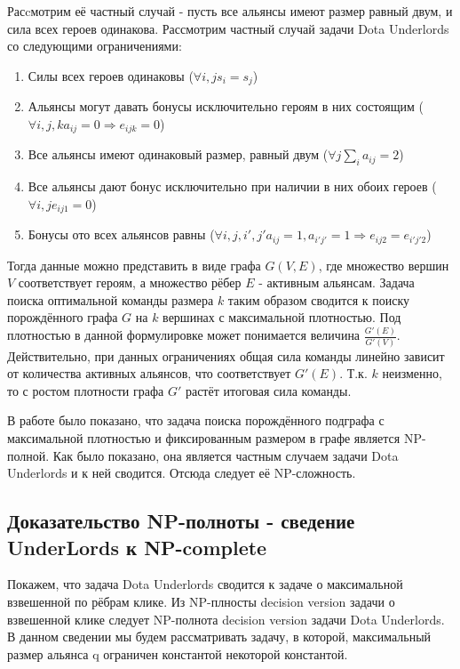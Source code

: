 \documentclass{article}
\begin{document}
Расcмотрим её частный случай - пусть все альянсы имеют размер равный двум, и сила всех героев одинакова. Рассмотрим частный случай задачи Dota Underlords со следующими ограничениями:

\begin{enumerate}
    \item Силы всех героев одинаковы ($\forall i, j s_i=s_j$)
    \item Альянсы могут давать бонусы исключительно героям в них состоящим ($\forall i, j, k a_{ij}=0 \Longrightarrow e_{ijk} = 0$)
    \item Все альянсы имеют одинаковый размер, равный двум ($\forall j \sum_i a_{ij}=2$)
    \item Все альянсы дают бонус исключительно при наличии в них обоих героев ($\forall i, j e_{ij1}=0$)
    \item Бонусы ото всех альянсов равны ($\forall i, j, i', j' a_{ij}=1, a_{i' j'}=1 \Longrightarrow e_{ij2}=e_{i' j' 2}$)
\end{enumerate}

Тогда данные можно представить в виде графа $G(V, E)$, где множество вершин $V$ соответствует героям, а множество рёбер $E$ - активным альянсам. Задача поиска оптимальной команды размера $k$ таким образом сводится к поиску порождённого графа $G$ на $k$ вершинах с максимальной плотностью. Под плотностью в данной формулировке может понимается величина $\frac{G'(E)}{G'(V)}$. Действительно, при данных ограничениях общая сила команды линейно зависит от количества активных альянсов, что соответствует $G'(E)$. Т.к. $k$ неизменно, то с ростом плотности графа $G'$ растёт итоговая сила команды.

В работе \cite{downey1995fixed} было показано, что задача поиска порождённого подграфа с максимальной плотностью и фиксированным размером в графе является NP-полной. Как было показано, она является частным случаем задачи Dota Underlords и к ней сводится. Отсюда следует её NP-сложность.

\subsection{Доказательство NP-полноты - сведение UnderLords к NP-complete}
Покажем, что задача Dota Underlords сводится к задаче о максимальной взвешенной по рёбрам клике.
Из NP-плносты decision version задачи о взвешенной клике следует NP-полнота decision version задачи Dota Underlords. В данном сведении мы будем рассматривать задачу, в которой, максимальный размер альянса q ограничен константой некоторой константой.
\end{document}
